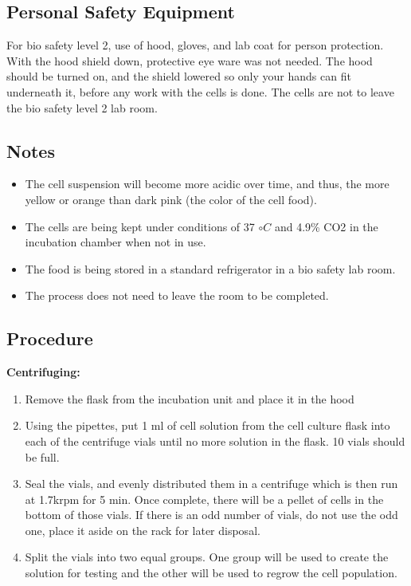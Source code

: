\documentclass[journal]{IEEEtran}
\begin{document}
\subsection{Personal Safety Equipment}
For bio safety level 2, use of hood, gloves, and lab coat for person protection. With the hood shield down, protective eye ware was not needed. The hood should be turned on, and the shield lowered so only your hands can fit underneath it,  before any work with the cells is done. The cells are not to leave the bio safety level 2 lab room.

\subsection{Notes}
\begin{itemize}
\item The cell suspension will become more acidic over time, and thus, the more yellow or orange than dark pink (the color of the cell food).
\item The cells are being kept under conditions of 37 $\circ C$ and 4.9\% CO2 in the incubation chamber when not in use. 
\item The food is being stored in a standard refrigerator in a bio safety lab room.
\item The process does not need to leave the room to be completed.
\end{itemize}

\subsection{Procedure}

\textbf{Centrifuging:}
\begin{enumerate}
\item Remove the flask from the incubation unit and place it in the hood
\item Using the pipettes, put 1 ml of cell solution from the cell culture flask into each of the centrifuge vials until no more solution in the flask. 10 vials should be full.
\item Seal the vials, and evenly distributed them in a centrifuge which is then run at 1.7krpm for 5 min. Once complete, there will be a pellet of cells in the bottom of those vials. If there is an odd number of vials, do not use the odd one, place it aside on the rack for later disposal.
\item Split the vials into two equal groups. One group will be used to create the solution for testing and the other will be used to regrow the cell population.
\end{enumerate}
\end{document}
